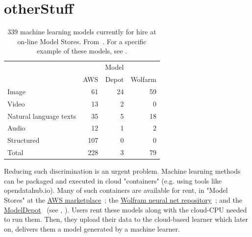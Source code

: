 \section{otherStuff}
\begin{table} 
\footnotesize
\begin{tabular}{lrrr} \hline

\rowcolor{gray!20}  &   & Model   &   \\ 
\rowcolor{gray!20}  & AWS &   Depot & Wolfarm \\ \hline
Image & 61 & 24 & 59 \\ \hline
\rowcolor{gray!20}Video & 13 & 2 & 0 \\ \hline
Natural language texts & 35 & 5 & 18 \\ \hline
\rowcolor{gray!20}Audio & 12 & 1 & 2 \\ \hline
Structured & 107 & 0 & 0 \\ \hline
\rowcolor{gray!20}Total & 228 & 3 & 79 \\ \hline
\end{tabular}
\caption{ 339 machine learning models
currently for hire at on-line Model Stores. From~\cite{xiu2019exploratory}. For 
a specific example of these models, see .}
\label{tbl:stats}
\end{table}
Reducing such discrimination is an urgent  problem.
Machine learning methods can be packaged and executed in cloud "containers" (e.g. using tools like opendatahub.io).
Many of such containers are  available for rent, in
"Model Stores" at the \href{https://aws.amazon.com/marketplace/solutions/machinelearning/}{AWS marketplace}~\cite{amazon};
the \href{https://resources.wolframcloud.com/NeuralNetRepository}{Wolfram neural net repository}~\cite{wolfram};  and  the  \href{https://modeldepot.io}{ModelDepot}~\cite{modeldepot}
(see  ,  ).  
Users rent these models along with the cloud-CPU needed
to run them. Then, they  upload their data to the cloud-based learner which  later on, delivers them a model generated by a machine learner.

